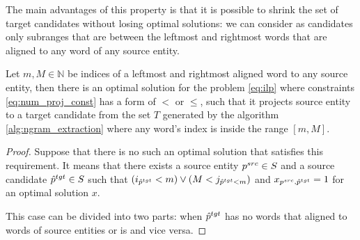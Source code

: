 The main advantages of this property is that it is possible to shrink the set of target candidates without losing
optimal solutions: we can consider as candidates only subranges that are between the leftmost and rightmost words that are aligned to any
word of any source entity.
\begin{theorem}
    Let \( m, M \in \mathbb{N} \) be indices of a leftmost and rightmost aligned word to any source entity, then there is
    an optimal solution for the problem \eqref{eq:ilp} where constraints \eqref{eq:num_proj_const} has a form
    of \( < \) or \( \leq \), such that it projects source entity to a target candidate from the set \( T \) generated by the algorithm
    \ref{alg:ngram_extraction} where any word's index is inside the range \( [m, M] \).
\end{theorem}
\begin{proof}
    Suppose that there is no such an optimal solution that satisfies this requirement. It means that there exists
    a source entity \( p^{src} \in S \) and a source candidate
    \( \hat{p}^{tgt} \in S \) such that \( (i_{\hat{p}^{tgt}} < m) \lor (M < j_{\hat{p}^{tgt} < m}) \)
    and \( x_{p^{src}, \hat{p}^{tgt}} = 1 \) for an optimal solution \( x \).

    This case can be divided into two parts: when \( \hat{p}^{tgt} \) has no words that aligned to words of source entities or
    is and vice versa.


\end{proof}
